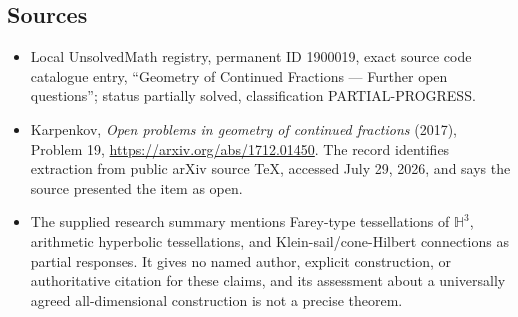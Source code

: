 \documentclass[11pt]{article}
\begin{document}
\subsection{Sources}
\begin{itemize}
\item Local UnsolvedMath registry, permanent ID 1900019, exact source code catalogue entry, ``Geometry of Continued Fractions --- Further open questions''; status partially solved, classification PARTIAL-PROGRESS.
\item Karpenkov, \emph{Open problems in geometry of continued fractions} (2017), Problem 19, \url{https://arxiv.org/abs/1712.01450}. The record identifies extraction from public arXiv source TeX, accessed July 29, 2026, and says the source presented the item as open.
\item The supplied research summary mentions Farey-type tessellations of $\mathbb H^3$, arithmetic hyperbolic tessellations, and Klein-sail/cone-Hilbert connections as partial responses. It gives no named author, explicit construction, or authoritative citation for these claims, and its assessment about a universally agreed all-dimensional construction is not a precise theorem.
\end{itemize}
\end{document}
